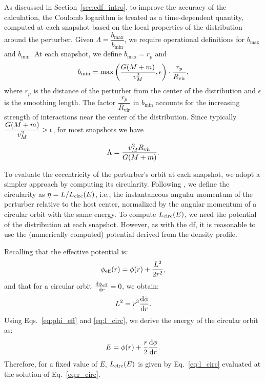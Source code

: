 \documentclass[twocolumn, a4paper]{article}
\begin{document}
As discussed in Section~\ref{sec:cdf_intro}, to improve the accuracy of the calculation, the Coulomb logarithm is treated as a time-dependent quantity, computed at each snapshot based on the local properties of the distribution around the perturber. Given \(\Lambda = \dfrac{b_\text{max}}{b_\text{min}}\), we require operational definitions for \(b_\text{max}\) and \(b_\text{min}\). At each snapshot, we define \(b_\text{max} = r_p\) and
\[
b_\text{min} = \max\qty(\dfrac{G \qty(M + m)}{v_M^2}, \epsilon) \cdot \dfrac{r_p}{R_\text{vir}},
\]
where \(r_p\) is the distance of the perturber from the center of the distribution and \(\epsilon\) is the smoothing length. The factor \(\dfrac{r_p}{R_\text{vir}}\) in \(b_\text{min}\) accounts for the increasing strength of interactions near the center of the distribution. Since typically \(\dfrac{G \qty(M + m)}{v_M^2} > \epsilon\), for most snapshots we have
\[
\Lambda = \dfrac{v_M^2 R_\text{vir}}{G \qty(M + m)}.
\]

To evaluate the eccentricity of the perturber's orbit at each snapshot, we adopt a simpler approach by computing its circularity. Following \citeauthor{Vasiliev2022}, we define the circularity as \(\eta = L / L_\text{circ}\qty(E)\), i.e., the instantaneous angular momentum of the perturber relative to the host center, normalized by the angular momentum of a circular orbit with the same energy. To compute \(L_\text{circ}\qty(E)\), we need the potential of the distribution at each snapshot. However, as with the \acrshort{df}, it is reasonable to use the (numerically computed) potential derived from the density profile.

Recalling that the effective potential is:
\begin{equation}
    \phi_\text{eff}\qty(r) = \phi\qty(r) + \dfrac{L^2}{2r^2},
    \label{eq:phi_eff}
\end{equation}
and that for a circular orbit \(\dv{\phi_\text{eff}}{r} = 0\), we obtain:
\begin{equation}
    L^2 = r^3 \dv{\phi}{r}.
    \label{eq:l_circ}
\end{equation}
Using Eqs.~\ref{eq:phi_eff} and \ref{eq:l_circ}, we derive the energy of the circular orbit as:
\begin{equation}
    E = \phi\qty(r) + \dfrac{r}{2} \dv{\phi}{r}.
    \label{eq:r_circ}
\end{equation}
Therefore, for a fixed value of \(E\), \(L_\text{circ}\qty(E)\) is given by Eq.~\ref{eq:l_circ} evaluated at the solution of Eq.~\ref{eq:r_circ}.
\end{document}
